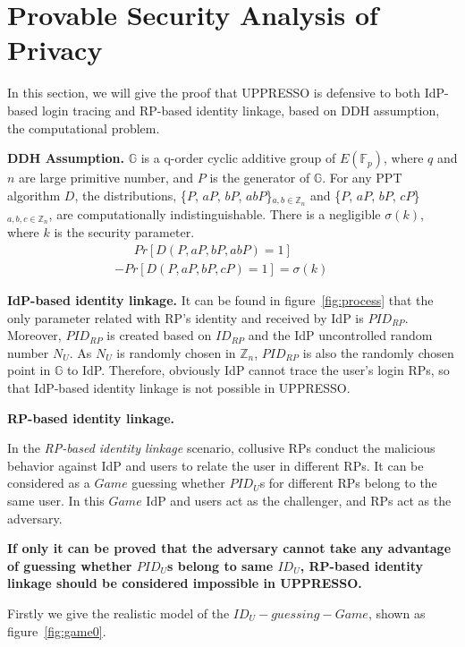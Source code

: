 \section{Provable Security Analysis of Privacy}
\label{sec:privacy}
In this section, we will give the proof that UPPRESSO is defensive to both IdP-based login tracing and RP-based identity linkage, based on DDH assumption\cite{GoldwasserK16}, the computational problem. 


\noindent\textbf{DDH Assumption.}
$\mathbb{G}$ is a q-order  cyclic additive group of $E(\mathbb{F}_p)$, where $q$ and $n$ are large primitive number, and $P$ is the generator of $\mathbb{G}$.  For any PPT algorithm $D$, the distributions, \{$P$, $aP$, $bP$, $abP$\}$_{a,b \in \mathbb{Z}_n}$ and \{$P$, $aP$, $bP$, $cP$\}$_{a,b,c \in \mathbb{Z}_n}$, are computationally indistinguishable. There is a negligible $\sigma(k)$, where $k$ is the security parameter. 
\begin{multline*}
    \ \ \ \ \ \ \ Pr[D(P, aP, bP, abP)=1]\\-Pr[D(P, aP, bP, cP)=1]=\sigma(k)\ \ \ \ \ \ \ \ 
\end{multline*}

\noindent\textbf{IdP-based identity linkage.} 
It can be found in figure~\ref{fig:process} that the only parameter related with RP's identity and received by IdP is $PID_{RP}$. Moreover, $PID_{RP}$ is created based on $ID_{RP}$ and the IdP uncontrolled random number $N_U$. As $N_U$ is randomly chosen in $\mathbb{Z}_n$,  $PID_{RP}$ is also the randomly chosen point in $\mathbb{G}$ to IdP. Therefore, obviously IdP cannot trace the user's login RPs, so that IdP-based identity linkage is not possible in UPPRESSO.

\noindent\textbf{RP-based identity linkage.} 

In the \emph{RP-based identity linkage} scenario, collusive RPs conduct the malicious behavior against IdP and users to relate the user in different RPs. It can be considered as a $Game$ guessing whether $PID_U$s for different RPs belong to the same user.  In this $Game$ IdP and users act as the challenger, and RPs act as the adversary. 

\textbf{If only it can be proved that the adversary cannot take any advantage of guessing whether $PID_U$s belong to same $ID_U$, RP-based identity linkage should be considered impossible in UPPRESSO.}

Firstly we give the realistic model of the $ID_U -guessing- Game$, shown as figure~\ref{fig:game0}.

